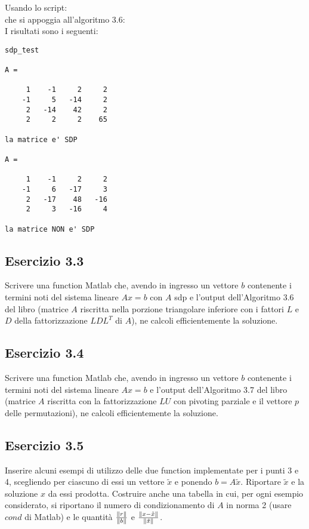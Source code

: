 Usando lo script: \\

che si appoggia all'algoritmo 3.6:\\

I risultati sono i seguenti:\\
\begin{lstlisting}[frame=single]
sdp_test

A =

     1    -1     2     2
    -1     5   -14     2
     2   -14    42     2
     2     2     2    65

la matrice e' SDP

A =

     1    -1     2     2
    -1     6   -17     3
     2   -17    48   -16
     2     3   -16     4

la matrice NON e' SDP
\end{lstlisting}


	\subsection{Esercizio 3.3}

Scrivere una function Matlab che, avendo in ingresso un vettore $b$ contenente i termini noti del sistema lineare $Ax = b$ con $A$ sdp e l’output dell’Algoritmo 3.6 del libro (matrice $A$ riscritta nella porzione triangolare inferiore con i fattori $L$ e $D$ della fattorizzazione $LDL^{T}$ di $A$), ne calcoli efficientemente la soluzione.





	\subsection{Esercizio 3.4}

Scrivere una function Matlab che, avendo in ingresso un vettore $b$ contenente i termini noti del sistema lineare $Ax = b$ e l’output dell’Algoritmo 3.7 del libro (matrice $A$ riscritta con la fattorizzazione $LU$ con pivoting parziale e il vettore $p$ delle permutazioni), ne calcoli efficientemente la soluzione.

\TODO


	\subsection{Esercizio 3.5}

 Inserire alcuni esempi di utilizzo delle due function implementate per i punti 3 e 4, scegliendo per ciascuno di essi un vettore $\tilde{x}$ e ponendo $b = A\tilde{x}$. Riportare $\tilde{x}$ e la soluzione $x$ da essi prodotta. Costruire anche una tabella in cui, per ogni esempio considerato, si riportano il numero di condizionamento di $A$ in norma 2 (usare $cond$ di Matlab) e le quantità $\frac{\norm{r}}{\norm{b}}$ e $\frac{\norm{x-\tilde{x}}}{\norm{\tilde{x}}}$.

